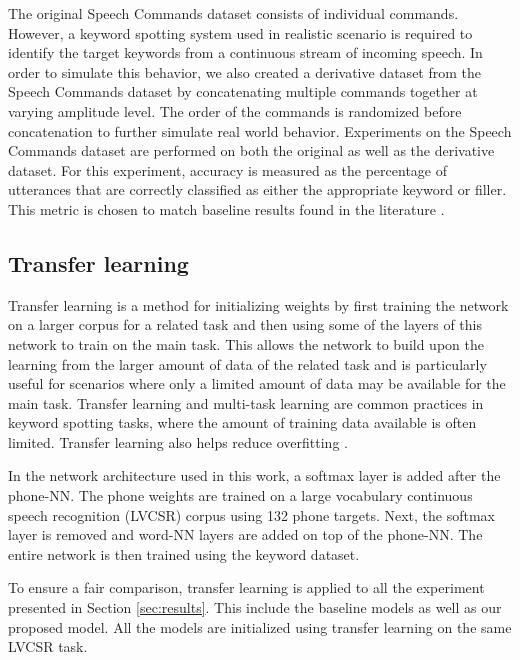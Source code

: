 \documentclass{article}
\begin{document}
The original Speech Commands dataset consists of individual commands. However, a keyword spotting system used in realistic scenario is required to identify the target keywords from a continuous stream of incoming speech. In order to simulate this behavior, we also created a derivative dataset from the Speech Commands dataset by concatenating multiple commands together at varying amplitude level. The order of the commands is randomized before concatenation to further simulate real world behavior. Experiments on the Speech Commands dataset are performed on both the original as well as the derivative dataset.  For this experiment, accuracy is measured as the percentage of utterances that are correctly classified as either the appropriate keyword or filler.  This metric is chosen to match baseline results found in the literature \cite{Zhang17}.

\subsection{Transfer learning}
\label{ssec:transfer}

Transfer learning is a method for initializing weights by first training the network on a larger corpus for a related task \cite{Pratt93} and then using some of the layers of this network to train on the main task.  This allows the network to build upon the learning from the larger amount of data of the related task and is particularly useful for scenarios where only a limited amount of data may be available for the main task.  Transfer learning and multi-task learning \cite{Sainath15, Panch16, Sun17} are common practices in keyword spotting tasks, where the amount of training data available is often limited. Transfer learning also helps reduce overfitting \cite{Panch16}. 

In the network architecture used in this work, a softmax layer is added after the phone-NN.  The phone weights are trained on a large vocabulary continuous speech recognition (LVCSR) corpus using 132 phone targets. Next, the softmax layer is removed and  word-NN layers are added on top of the phone-NN. The entire network is then trained using the keyword dataset.

To ensure a fair comparison,  transfer learning is applied to all the experiment presented in Section \ref{sec:results}. This include the baseline models as well as our proposed model. All the models are initialized using transfer learning on the same LVCSR task.
\end{document}
